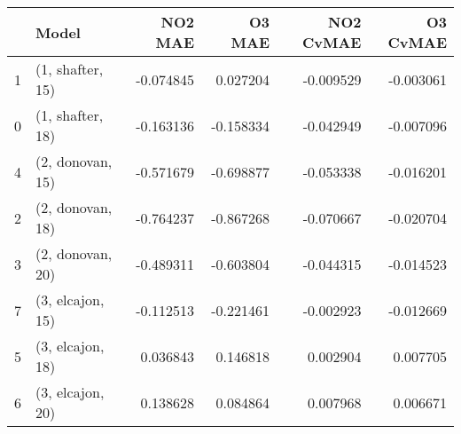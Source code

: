 \begin{tabular}{llrrrr}
\toprule
{} &             Model &   NO2 MAE &    O3 MAE &  NO2 CvMAE &  O3 CvMAE \\
\midrule
1 &  (1, shafter, 15) & -0.074845 &  0.027204 &  -0.009529 & -0.003061 \\
0 &  (1, shafter, 18) & -0.163136 & -0.158334 &  -0.042949 & -0.007096 \\
4 &  (2, donovan, 15) & -0.571679 & -0.698877 &  -0.053338 & -0.016201 \\
2 &  (2, donovan, 18) & -0.764237 & -0.867268 &  -0.070667 & -0.020704 \\
3 &  (2, donovan, 20) & -0.489311 & -0.603804 &  -0.044315 & -0.014523 \\
7 &  (3, elcajon, 15) & -0.112513 & -0.221461 &  -0.002923 & -0.012669 \\
5 &  (3, elcajon, 18) &  0.036843 &  0.146818 &   0.002904 &  0.007705 \\
6 &  (3, elcajon, 20) &  0.138628 &  0.084864 &   0.007968 &  0.006671 \\
\bottomrule
\end{tabular}
